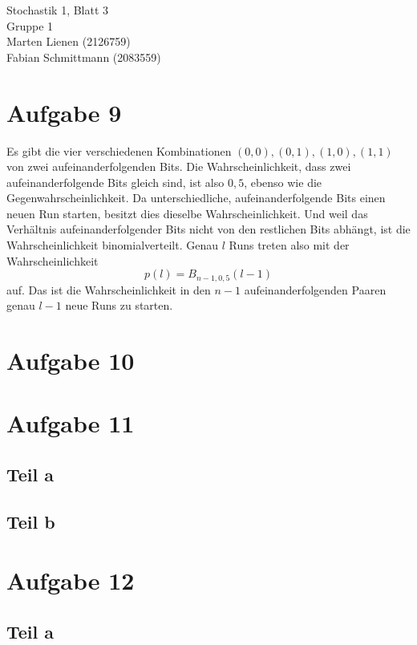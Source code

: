 \documentclass[10pt,a4paper]{article}
\begin{document}
Stochastik 1, Blatt 3\\
Gruppe 1\\
Marten Lienen (2126759)\\
Fabian Schmittmann (2083559)

\section{Aufgabe 9}
Es gibt die vier verschiedenen Kombinationen $(0, 0), (0, 1), (1, 0), (1, 1)$ von zwei aufeinanderfolgenden Bits.
Die Wahrscheinlichkeit, dass zwei aufeinanderfolgende Bits gleich sind, ist also $0,5$, ebenso wie die Gegenwahrscheinlichkeit.
Da unterschiedliche, aufeinanderfolgende Bits einen neuen Run starten, besitzt dies dieselbe Wahrscheinlichkeit.
Und weil das Verhältnis aufeinanderfolgender Bits nicht von den restlichen Bits abhängt, ist die Wahrscheinlichkeit binomialverteilt.
Genau $l$ Runs treten also mit der Wahrscheinlichkeit
\begin{equation}
  p(l) = B_{n - 1, 0,5}(l - 1)
\end{equation}
auf.
Das ist die Wahrscheinlichkeit in den $n - 1$ aufeinanderfolgenden Paaren genau $l - 1$ neue Runs zu starten.

\section{Aufgabe 10}

\section{Aufgabe 11}

\subsection{Teil a}

\subsection{Teil b}

\section{Aufgabe 12}

\subsection{Teil a}
\end{document}
